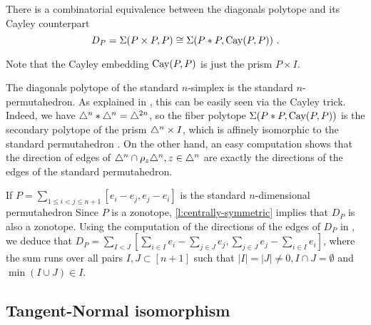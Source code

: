 \begin{lemma}
	\label{l:cayleytrick}
	There is a combinatorial equivalence between the diagonals polytope and its Cayley counterpart
	\[ 
		D_P=\Sigma(P\times P,P) \cong \Sigma(P*P,\operatorname{Cay}(P,P))  \ . 
	\]
\end{lemma}
Note that the Cayley embedding $\operatorname{Cay}(P,P)$ is just the prism $P \times I$. 

\begin{example}
\label{e:simplex-permutahedron}
	The diagonals polytope of the standard $n$-simplex is the standard $n$-permutahedron. 
	As explained in \cite[Example 9.2.20]{deloeraTriangulations2010}, this can be easily seen via the Cayley trick.
	Indeed, we have $\triangle^n * \triangle^n = \triangle^{2n}$, so the fiber polytope $\Sigma(P*P,\operatorname{Cay}(P,P))$ is the secondary polytope of the prism $\triangle^n \times I$, which is affinely isomorphic to the standard permutahedron \cite[Theorem 6.2.6]{deloeraTriangulations2010}.
	On the other hand, an easy computation shows that the direction of edges of $\triangle^n \cap \rho_z \triangle^n, z \in \triangle^n$ are exactly the directions of the edges of the standard permutahedron. 
\end{example}

\begin{example}
\label{e:permutahedron}
	If $P=\sum_{1 \leq i<j \leq n+1} [e_i-e_j, e_j-e_i]$ is the standard $n$-dimensional permutahedron
	Since $P$ is a zonotope, \cref{l:centrally-symmetric} implies that $D_P$ is also a zonotope. 
	Using the computation of the directions of the edges of $D_P$ in \cite[Theorem 3.6]{GLA21}, we deduce that $D_P=\sum_{I<J} [\sum_{i \in I}e_i - \sum_{j \in J}e_j, \sum_{j \in J} e_j - \sum_{i \in I}e_i]$, where the sum runs over all pairs $I,J\subset [n+1]$ such that $|I|=|J|\neq 0, I\cap J = \emptyset$ and $\min(I \cup J) \in I$.
\end{example}

\subsection{Tangent-Normal isomorphism}

